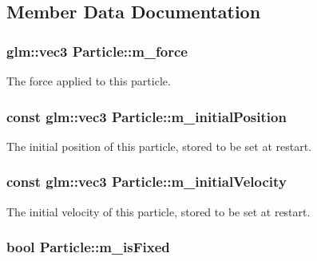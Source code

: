 \subsection{Member Data Documentation}
\hypertarget{classParticle_af4db2db523aa91152dab38bc2ed1e460}{
\subsubsection[{m\+\_\+force}]{\setlength{\rightskip}{0pt plus 5cm}glm\+::vec3 Particle\+::m\+\_\+force\hspace{0.3cm}{\ttfamily [private]}}}\label{classParticle_af4db2db523aa91152dab38bc2ed1e460}
The force applied to this particle. \hypertarget{classParticle_aa6c61c14e6ef274fb54700a5912e78bf}{
\subsubsection[{m\+\_\+initial\+Position}]{\setlength{\rightskip}{0pt plus 5cm}const glm\+::vec3 Particle\+::m\+\_\+initial\+Position\hspace{0.3cm}{\ttfamily [private]}}}\label{classParticle_aa6c61c14e6ef274fb54700a5912e78bf}
The initial position of this particle, stored to be set at restart. \hypertarget{classParticle_af83d2d60768349ca902f83de1a59e355}{
\subsubsection[{m\+\_\+initial\+Velocity}]{\setlength{\rightskip}{0pt plus 5cm}const glm\+::vec3 Particle\+::m\+\_\+initial\+Velocity\hspace{0.3cm}{\ttfamily [private]}}}\label{classParticle_af83d2d60768349ca902f83de1a59e355}
The initial velocity of this particle, stored to be set at restart. \hypertarget{classParticle_a1a986129338efef4273582fd5ce9eaac}{
\subsubsection[{m\+\_\+is\+Fixed}]{\setlength{\rightskip}{0pt plus 5cm}bool Particle\+::m\+\_\+is\+Fixed\hspace{0.3cm}{\ttfamily [private]}}}\label{classParticle_a1a986129338efef4273582fd5ce9eaac}
